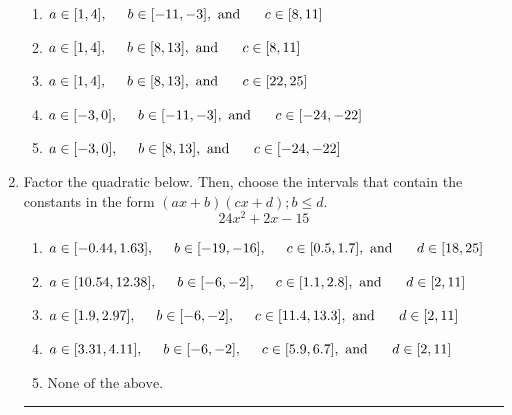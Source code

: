 \documentclass[14pt]{extbook}
\newcommand{\litem}[1]{\item#1\hspace*{-1cm}\rule{\textwidth}{0.4pt}}
\begin{document}
\begin{enumerate}
{\begin{center}
\end{center}
\begin{enumerate}[label=\Alph*.]
\item \( a \in [1, 4], \hspace*{5mm} b \in [-11, -3], \text{ and } \hspace*{5mm} c \in [8, 11] \)
\item \( a \in [1, 4], \hspace*{5mm} b \in [8, 13], \text{ and } \hspace*{5mm} c \in [8, 11] \)
\item \( a \in [1, 4], \hspace*{5mm} b \in [8, 13], \text{ and } \hspace*{5mm} c \in [22, 25] \)
\item \( a \in [-3, 0], \hspace*{5mm} b \in [-11, -3], \text{ and } \hspace*{5mm} c \in [-24, -22] \)
\item \( a \in [-3, 0], \hspace*{5mm} b \in [8, 13], \text{ and } \hspace*{5mm} c \in [-24, -22] \)

\end{enumerate} }
\litem{
Factor the quadratic below. Then, choose the intervals that contain the constants in the form $(ax+b)(cx+d); b \leq d.$\[ 24x^{2} +2 x -15 \]\begin{enumerate}[label=\Alph*.]
\item \( a \in [-0.44, 1.63], \hspace*{5mm} b \in [-19, -16], \hspace*{5mm} c \in [0.5, 1.7], \text{ and } \hspace*{5mm} d \in [18, 25] \)
\item \( a \in [10.54, 12.38], \hspace*{5mm} b \in [-6, -2], \hspace*{5mm} c \in [1.1, 2.8], \text{ and } \hspace*{5mm} d \in [2, 11] \)
\item \( a \in [1.9, 2.97], \hspace*{5mm} b \in [-6, -2], \hspace*{5mm} c \in [11.4, 13.3], \text{ and } \hspace*{5mm} d \in [2, 11] \)
\item \( a \in [3.31, 4.11], \hspace*{5mm} b \in [-6, -2], \hspace*{5mm} c \in [5.9, 6.7], \text{ and } \hspace*{5mm} d \in [2, 11] \)
\item \( \text{None of the above.} \)


\end{enumerate}}
\end{enumerate}
\end{document}
